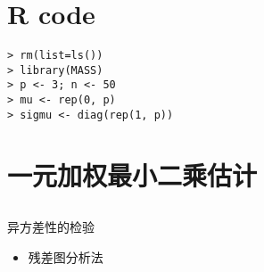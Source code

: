 \documentclass[10pt,CJKutf8]{beamer}
\begin{document}
\begin{CJK}{UTF8}{gbsn}
\section{R code}
\begin{frame}[fragile]
\begin{Verbatim}[label={模拟 R代码}]
> rm(list=ls())
> library(MASS)
> p <- 3; n <- 50
> mu <- rep(0, p)
> sigmu <- diag(rep(1, p))
\end{Verbatim}
\end{frame}





\section{一元加权最小二乘估计}
\subsection{}
\begin{frame}{异方差性的检验}
\begin{itemize}
  \item 残差图分析法
\end{itemize}
\end{frame}




\end{CJK}
\end{document}
